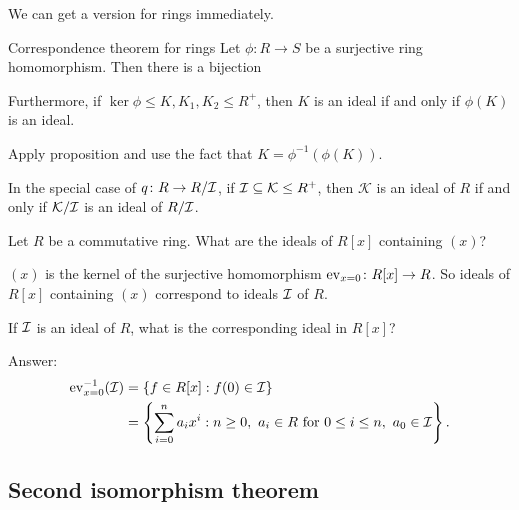 \documentclass[12pt,letterpaper]{report}
\begin{document}
We can get a version for rings immediately.

\begin{thm}{Correspondence theorem for rings}{}
  Let $\phi \colon R \to S$ be a surjective ring homomorphism.
  Then there is a bijection
  \begin{center}
  \end{center}
  Furthermore, if $\ker\phi \leq K, K_1, K_2 \leq R^+$, then $K$ is an ideal if and only if
  $\phi(K)$ is an ideal.
\end{thm}

\begin{thmproof}
  Apply proposition and use the fact that $K = \phi^{-1}(\phi(K))$.
\end{thmproof}

In the special case of $q \colon R \to R/\mathcal{I}$, if $\mathcal{I} \subseteq \mathcal{K} \leq R^+$, then
$\mathcal{K}$ is an ideal of $R$ if and only if $\mathcal{K}/\mathcal{I}$ is an ideal of $R/\mathcal{I}$.

\begin{ex}
  Let $R$ be a commutative ring.
  What are the ideals of $R[x]$ containing $(x)$?

  $(x)$ is the kernel of the surjective homomorphism $\operatorname{ev}_{x = 0} \colon R[x] \to R$.
  So ideals of $R[x]$ containing $(x)$ correspond to ideals $\mathcal{I}$ of $R$.

  If $\mathcal{I}$ is an ideal of $R$, what is the corresponding ideal in $R[x]$?

  Answer:
  \begin{align*}
    \operatorname{ev}_{x = 0}^{-1}(\mathcal{I}) &= \{f \in R[x] : f(0) \in \mathcal{I}\} \\
    &= \left\{ \sum_{i = 0}^n a_i x^i : n \geq 0, \ a_i \in R \text{ for } 0 \leq i \leq n,
      \ a_0 \in \mathcal{I} \right\}.
  \end{align*}
\end{ex}

\pagebreak
\subsection{Second isomorphism theorem}
\end{document}
